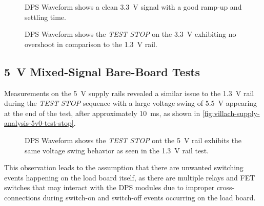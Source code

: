 \begin{figure}[h!]
    \centering
    \caption[\SI{3.3}{\volt} Rail zoomed-in at \emph{TEST START}
    without \acs{DUT}]{
        \ac{DPS} Waveform shows a clean \SI{3.3}{\volt} signal with a good
        ramp-up and settling time.
    }
    \label{fig:villach-supply-analysis-3v3-test-start}
\end{figure}

\begin{figure}[h!]
    \centering
    \caption[\SI{3.3}{\volt} Rail at \emph{TEST STOP}
    without \acs{DUT}]{
        \ac{DPS} Waveform shows the \emph{TEST STOP} on the \SI{3.3}{\volt}
        exhibiting no overshoot in comparison to the \SI{1.3}{\volt} rail.
    }
    \label{fig:villach-supply-analysis-3v3-test-stop}
\end{figure}

\subsection{\SI{5}{\volt} Mixed-Signal Bare-Board Tests}
\label{subsec:onsite-measurements-no-dut-5v0}

Measurements on the \SI{5}{\volt} supply rails revealed a similar
issue to the \SI{1.3}{\volt} rail during the \emph{TEST STOP} sequence with a
large voltage swing of \SI{5.5}{\volt} appearing at the end of the
test, after approximately \SI{10}{\milli\second}, as shown
in \autoref{fig:villach-supply-analysis-5v0-test-stop}.

\begin{figure}[h!]
    \centering
    \caption[\SI{5}{\volt} Rail at \emph{TEST STOP}
    without \acs{DUT}]{
        \ac{DPS} Waveform shows the \emph{TEST STOP} ont the \SI{5}{\volt}
        rail exhibits the same voltage swing behavior as seen in the
        \SI{1.3}{\volt} rail test.
    }
    \label{fig:villach-supply-analysis-5v0-test-stop}
\end{figure}

This observation leads to the assumption that there are unwanted switching
events happening on the load board itself, as there are multiple relays
and \ac{FET} switches that may interact with the \ac{DPS} modules due to
improper cross-connections during switch-on and switch-off events occurring on
the load board.

